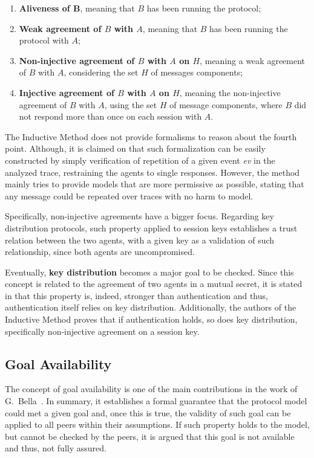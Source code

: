 \begin{enumerate}
  \item \textbf{Aliveness of B}, meaning that $B$ has been running the protocol;
  \item \textbf{Weak agreement of $B$ with $A$}, meaning that $B$ has been running the protocol with $A$;
  \item \textbf{Non-injective agreement of $B$ with $A$ on $H$}, meaning a weak agreement of $B$ with $A$, considering the set $H$ of messages components;
  \item \textbf{Injective agreement of $B$ with $A$ on $H$}, meaning the non-injective agreement of $B$ with $A$, using the set $H$ of message components, where $B$ did not respond more than once on each session with $A$.
\end{enumerate}

The Inductive Method does not provide formalisms to reason about the fourth point. Although, it is claimed on \cite{Bella2007} that such formalization can be easily constructed by simply verification of repetition of a given event \textit{ev} in the analyzed trace, restraining the agents to single responses. However, the method mainly tries to provide models that are more permissive as possible, stating that any message could be repeated over traces with no harm to model.

Specifically, non-injective agreements have a bigger focus. Regarding key distribution protocols, such property applied to session keys establishes a trust relation between the two agents, with a given key as a validation of such relationship, since both agents are uncompromised.

Eventually, \textbf{key distribution} becomes a major goal to be checked. Since this concept is related to the agreement of two agents in a mutual secret, it is stated in \cite{BellareRogaway93} that this property is, indeed, stronger than authentication and thus, authentication itself relies on key distribution. Additionally, the authors of the Inductive Method proves that if authentication holds, so does key distribution, specifically non-injective agreement on a session key.



\subsection{Goal Availability}
The concept of goal availability is one of the main contributions in the work of G.~Bella~\cite{Bella2007}. In summary, it establishes a formal guarantee that the protocol model could met a given goal and, once this is true, the validity of such goal can be applied to all peers within their assumptions. If such property holds to the model, but cannot be checked by the peers, it is argued that this goal is not available and thus, not fully assured.

